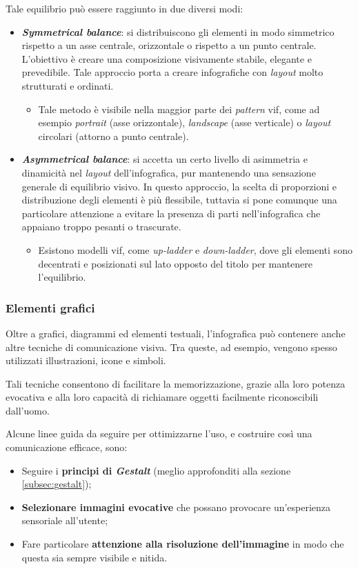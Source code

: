 Tale equilibrio può essere raggiunto in due diversi modi:
\begin{itemize}
    \item \textbf{\emph{Symmetrical balance}}: si distribuiscono gli elementi in modo simmetrico rispetto a un asse centrale, orizzontale o rispetto a un punto centrale. L'obiettivo è creare una composizione visivamente stabile, elegante e prevedibile.
    Tale approccio porta a creare infografiche con \emph{layout} molto strutturati e ordinati.
    \begin{itemize}
        \item Tale metodo è visibile nella maggior parte dei \emph{pattern} \gls{vif}, come ad esempio \emph{portrait} (asse orizzontale), \emph{landscape} (asse verticale) o \emph{layout} circolari (attorno a punto centrale).
    \end{itemize}
    \item \textbf{\emph{Asymmetrical balance}}: si accetta un certo livello di asimmetria e dinamicità nel \emph{layout} dell'infografica, pur mantenendo una sensazione generale di equilibrio visivo. In questo approccio, la scelta di proporzioni e distribuzione
    degli elementi è più flessibile, tuttavia si pone comunque una particolare attenzione a evitare la presenza di parti nell'infografica che appaiano troppo pesanti o trascurate.
    \begin{itemize}
        \item Esistono modelli \gls{vif}, come \emph{up-ladder} e \emph{down-ladder}, dove gli elementi sono decentrati e posizionati sul lato opposto del titolo per mantenere l'equilibrio.
    \end{itemize}
\end{itemize}


\subsubsection{Elementi grafici}
Oltre a grafici, diagrammi ed elementi testuali, l'infografica può contenere anche altre tecniche di comunicazione visiva. Tra queste, ad esempio, vengono spesso utilizzati
illustrazioni, icone e simboli.

Tali tecniche consentono di facilitare la memorizzazione, grazie alla loro potenza evocativa e alla loro capacità di richiamare oggetti facilmente riconoscibili dall'uomo.

\bigskip
\noindent Alcune linee guida da seguire per ottimizzarne l'uso, e costruire così una comunicazione efficace, sono:
\begin{itemize}
    \item Seguire i \textbf{principi di \emph{Gestalt}} (meglio approfonditi alla sezione \ref{subsec:gestalt});
    \item \textbf{Selezionare immagini evocative} che possano provocare un'esperienza sensoriale all'utente;
    \item Fare particolare \textbf{attenzione alla risoluzione dell'immagine} in modo che questa sia sempre visibile e nitida.
\end{itemize}

